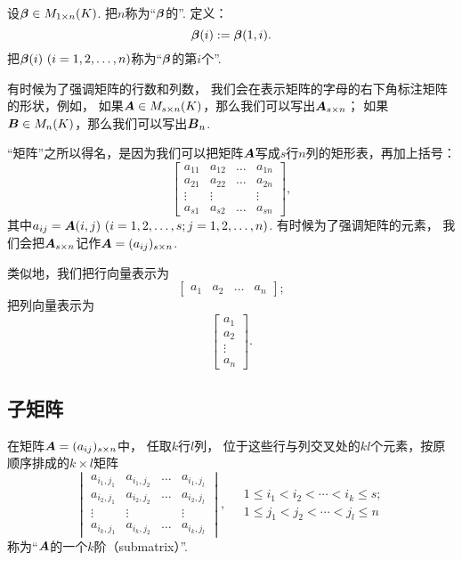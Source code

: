 设\(\boldsymbol\beta\in M_{1 \times n}(K)\).
把\(n\)称为“\(\boldsymbol\beta\)的”.
定义：\[
	\boldsymbol\beta(i) := \boldsymbol\beta(1,i).
\]
把\(\vb\beta(i)\ (i=1,2,\dotsc,n)\)称为“\(\boldsymbol\beta\)的第\(i\)个”.

有时候为了强调矩阵的行数和列数，
我们会在表示矩阵的字母的右下角标注矩阵的形状，例如，
如果\(\boldsymbol{A}\in M_{s \times n}(K)\)，那么我们可以写出\(\boldsymbol{A}_{s \times n}\)；
如果\(\boldsymbol{B}\in M_n(K)\)，那么我们可以写出\(\boldsymbol{B}_n\).

“矩阵”之所以得名，是因为我们可以把矩阵\(\boldsymbol{A}\)写成\(s\)行\(n\)列的矩形表，再加上括号：\[
	\begin{bmatrix}
		a_{11} & a_{12} & \dots & a_{1n} \\
		a_{21} & a_{22} & \dots & a_{2n} \\
		\vdots & \vdots & & \vdots \\
		a_{s1} & a_{s2} & \dots & a_{sn}
	\end{bmatrix},
\]
其中\(a_{ij}=\vb{A}(i,j)\ (i=1,2,\dotsc,s;j=1,2,\dotsc,n)\).
有时候为了强调矩阵的元素，
我们会把\(\boldsymbol{A}_{s \times n}\)记作\(\boldsymbol{A}=(a_{ij})_{s \times n}\).

类似地，我们把行向量表示为\[
	\begin{bmatrix}
		a_1 & a_2 & \dots & a_n
	\end{bmatrix};
\]
把列向量表示为\[
	\begin{bmatrix}
		a_1 \\ a_2 \\ \vdots \\ a_n
	\end{bmatrix}.
\]

\subsection{子矩阵}
\begin{definition}
在矩阵\(\boldsymbol{A}=(a_{ij})_{s \times n}\)中，
任取\(k\)行\(l\)列，
位于这些行与列交叉处的\(kl\)个元素，按原顺序排成的\(k \times l\)矩阵\[
	\begin{vmatrix}
		a_{i_1,j_1} & a_{i_1,j_2} & \dots & a_{i_1,j_l} \\
		a_{i_2,j_1} & a_{i_2,j_2} & \dots & a_{i_2,j_l} \\
		\vdots & \vdots & & \vdots \\
		a_{i_k,j_1} & a_{i_k,j_2} & \dots & a_{i_k,j_l}
	\end{vmatrix},
	\quad
	\begin{array}{c}
		1 \leq i_1 < i_2 < \dotsb < i_k \leq s; \\
		1 \leq j_1 < j_2 < \dotsb < j_l \leq n
	\end{array}
\]称为“\(\boldsymbol{A}\)的一个\(k\)阶（submatrix）”.
\end{definition}

